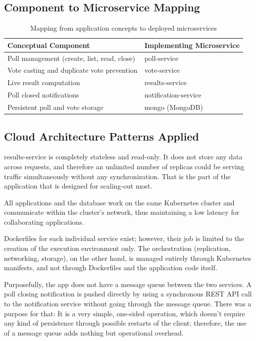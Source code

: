 \subsection{Component to Microservice Mapping}

\begin{table}[h]
\centering
\begin{tabular}{@{}ll@{}}
\toprule
\textbf{Conceptual Component} & \textbf{Implementing Microservice} \\
\midrule
Poll management (create, list, read, close) & poll-service \\
Vote casting and duplicate vote prevention & vote-service \\
Live result computation & results-service \\
Poll closed notifications & notification-service \\
Persistent poll and vote storage & mongo (MongoDB) \\
\bottomrule
\end{tabular}
\caption{Mapping from application concepts to deployed microservices}
\end{table}

\subsection{Cloud Architecture Patterns Applied}

\begin{description}[leftmargin=0cm,style=nextline]
    \item[Horizontally Scaling Compute Pattern] results-service is completely stateless and read-only. It does not store any data across requests, and therefore an unlimited number of replicas could be serving traffic simultaneously without any synchronization. That is the part of the application that is designed for scaling-out most.


    \item[Colocate Pattern] All applications and the database work on the same Kubernetes cluster and communicate within the cluster's network, thus maintaining a low latency for collaborating applications.

    \item[Separation of Concerns between provisioning and orchestration]
       Dockerfiles for each individual service exist; however, their job is limited to the creation of the execution environment only. The orchestration (replication, networking, storage), on the other hand, is managed entirely through Kubernetes manifests, and not through Dockerfiles and the application code itself.

    \item[Avoidance of the Queue Centric Workflow Pattern]Purposefully, the app does not have a message queue between the two services. A poll closing notification is pushed directly by using a synchronous REST API call to the notification service without going through the message queue. There was a purpose for that: It is a very simple, one-sided operation, which doesn't require any kind of persistence through possible restarts of the client; therefore, the use of a message queue adds nothing but operational overhead.
\end{description}
